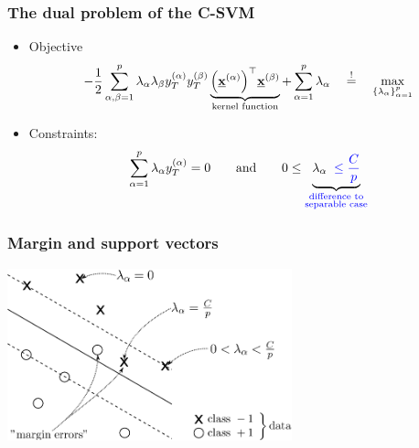 \begin{frame}\frametitle{The dual problem of the C-SVM}

	\begin{itemize}
	\item Objective
		\begin{equation}
			-\frac{1}{2} \sum\limits_{\alpha,\beta = 1}^p \lambda_\alpha
				\lambda_\beta y_T^{(\alpha)} y_T^{(\beta)} 
				\underbrace{ \Big( \underline{\mathbf{x}}^{(\alpha)} \Big)^\top 
					\underline{\mathbf{x}}^{(\beta)}}_{\text{kernel function}}
				+ \sum\limits_{\alpha = 1}^p \lambda_\alpha 
				\quad \stackrel{\mathrm{!}}{=} \quad \max_{\{\lambda_\alpha\}_{\alpha=1}^p}
		\end{equation}
		
	\item Constraints:
		\begin{equation}
			\sum\limits_{\alpha = 1}^p \lambda_\alpha y_T^{(\alpha)} = 0 \qquad \text{and} \qquad
			0 \leq \underbrace{\lambda_\alpha 
				\;\;{\color{blue}\leq \frac{C}{p}} }_{
				\substack{ \color{blue} \text{difference to} \\
					\color{blue} \text{separable case}}} 
		\end{equation}
	\end{itemize}
\end{frame}

\begin{frame} \frametitle{Margin and support vectors}
	\begin{center} 
		\includegraphics[height=5cm]{img/section2_fig16_v2} 
	\end{center}
	
	
	\pause
	
	
	
\end{frame}

